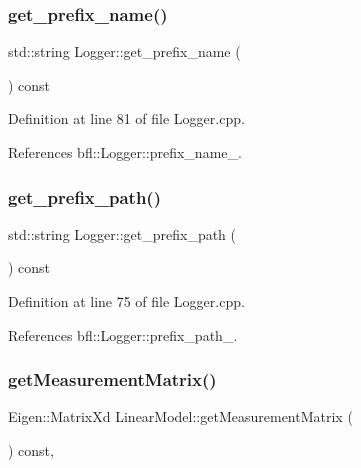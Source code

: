 \subsubsection{\texorpdfstring{get\+\_\+prefix\+\_\+name()}{get\_prefix\_name()}}
{\footnotesize\ttfamily std\+::string Logger\+::get\+\_\+prefix\+\_\+name (\begin{DoxyParamCaption}{ }\end{DoxyParamCaption}) const\hspace{0.3cm}{\ttfamily [inherited]}}



Definition at line 81 of file Logger.\+cpp.



References bfl\+::\+Logger\+::prefix\+\_\+name\+\_\+.

\mbox{\label{classbfl_1_1Logger_a56cf1a4e712bf23d9978420a8a59a62b}} 
\subsubsection{\texorpdfstring{get\+\_\+prefix\+\_\+path()}{get\_prefix\_path()}}
{\footnotesize\ttfamily std\+::string Logger\+::get\+\_\+prefix\+\_\+path (\begin{DoxyParamCaption}{ }\end{DoxyParamCaption}) const\hspace{0.3cm}{\ttfamily [inherited]}}



Definition at line 75 of file Logger.\+cpp.



References bfl\+::\+Logger\+::prefix\+\_\+path\+\_\+.

\mbox{\label{classbfl_1_1LinearModel_a7dbfa7e8cbdc9ee863febf92e6046400}} 
\subsubsection{\texorpdfstring{get\+Measurement\+Matrix()}{getMeasurementMatrix()}}
{\footnotesize\ttfamily Eigen\+::\+Matrix\+Xd Linear\+Model\+::get\+Measurement\+Matrix (\begin{DoxyParamCaption}{ }\end{DoxyParamCaption}) const\hspace{0.3cm}{\ttfamily [override]}, {\ttfamily [virtual]}}



